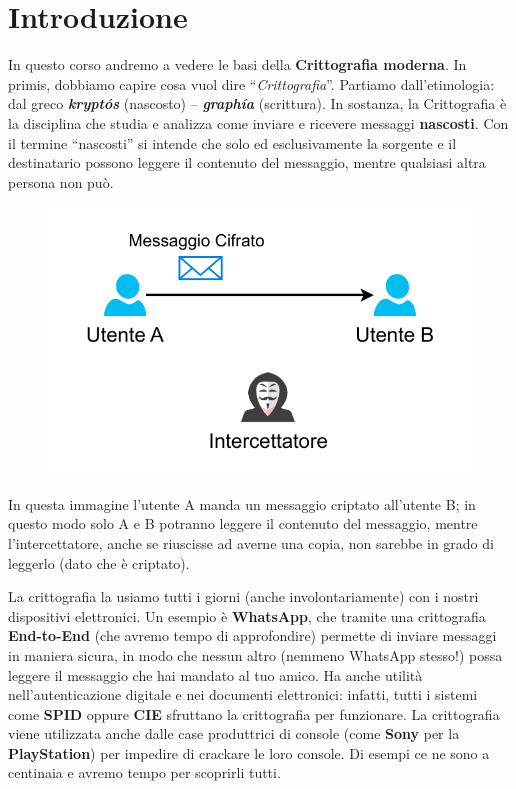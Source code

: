\documentclass{report}
\begin{document}
\section{Introduzione}

In questo corso andremo a vedere le basi della \textbf{Crittografia moderna}. In primis, dobbiamo capire cosa vuol dire “\textit{Crittografia}”. Partiamo dall’etimologia: dal greco \textbf{\textit{kryptós}} (nascosto) – \textbf{\textit{graphía}} (scrittura). In sostanza, la Crittografia è la disciplina che studia e analizza come inviare e ricevere messaggi \textbf{nascosti}. Con il termine “nascosti” si intende che solo ed esclusivamente la sorgente e il destinatario possono leggere il contenuto del messaggio, mentre qualsiasi altra persona non può.

\begin{figure}[h]
     \centering
    \includegraphics[width=0.6\linewidth]{logos/cripto1.pdf}
\end{figure}

In questa immagine l'utente A manda un messaggio criptato all’utente B; in questo modo solo A e B potranno leggere il contenuto del messaggio, mentre l’intercettatore, anche se riuscisse ad averne una copia, non sarebbe in grado di leggerlo (dato che è criptato).

La crittografia la usiamo tutti i giorni (anche involontariamente) con i nostri dispositivi elettronici. Un esempio è \textbf{WhatsApp}, che tramite una crittografia \textbf{End-to-End} (che avremo tempo di approfondire) permette di inviare messaggi in maniera sicura, in modo che nessun altro (nemmeno WhatsApp stesso!) possa leggere il messaggio che hai mandato al tuo amico. Ha anche utilità nell’autenticazione digitale e nei documenti elettronici: infatti, tutti i sistemi come \textbf{SPID} oppure \textbf{CIE} sfruttano la crittografia per funzionare. La crittografia viene utilizzata anche dalle case produttrici di console (come \textbf{Sony} per la \textbf{PlayStation}) per impedire di crackare le loro console. Di esempi ce ne sono a centinaia e avremo tempo per scoprirli tutti.
\end{document}
